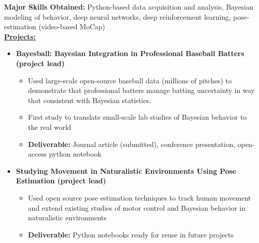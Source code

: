 
\smallskip
{\small{\color{skills}\textbf{Major Skills Obtained:}} Python-based data acquisition and analysis, Bayesian modeling of behavior, deep neural networks, deep reinforcement learning, pose-estimation (video-based MoCap)} \\
\smallskip
{\color{accent}\underline{\textbf{Projects:}}}\\
\begin{adjustwidth}{0.5em}{0pt}
    \begin{itemize}
    \item[\color{accent}\ding{224}] {\color{emphasis}\textbf{Bayesball: Bayesian Integration in Professional Baseball Batters (project lead) \hspace{10pt} }}\\
    \smallskip\vspace{-.75em}
        \begin{itemize}
            \item Used large-scale open-source baseball data (millions of pitches) to demonstrate that professional batters manage batting uncertainty in way that consistent with Bayesian statistics.
            \item First study to translate small-scale lab studies of Bayesian behavior to the real world
            \item {\color{pink} \textbf{Deliverable:}} Journal article (submitted), conference presentation, open-access python notebook
        \end{itemize}
    \smallskip
    \item[\color{accent}\ding{224}] {\color{emphasis}\textbf{Studying Movement in Naturalistic Environments Using Pose Estimation (project lead)}}\\
    \smallskip
        \begin{itemize}
            \item Used open source pose estimation techniques to track human movement and extend existing studies of motor control and Bayesian behavior in naturalistic environments
            \item {\color{pink} \textbf{Deliverable:}} Python notebooks ready for reuse in future projects 
        \end{itemize}
    \end{itemize}
\end{adjustwidth}
\vspace{-0.5em}
\divider

